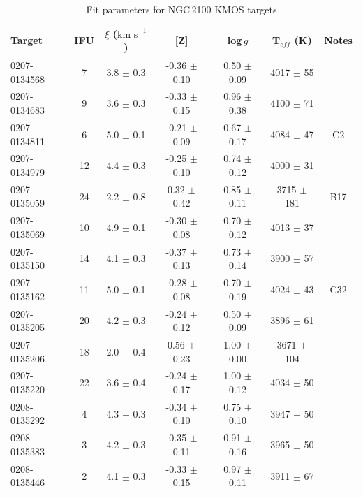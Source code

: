 \documentclass[useAMS,usenatbib]{mn2e}
\def\kms{$\mbox{km s}^{-1}$}
\begin{document}
\begin{table}
\begin{center}
\caption{
Fit parameters for NGC\,2100 KMOS targets
\label{tb:stellar-params}
         }
\scriptsize
\begin{tabular}{lc ccccc}
 \hline
 \hline
  Target  & IFU & $\xi$ (\kms) & [Z] & log\,$g$ & T$_{eff}$ (K) & Notes\\
  \hline
0207-0134568 & 7  & 3.8 $\pm$ 0.3 &  -0.36 $\pm$ 0.10 & 0.50 $\pm$ 0.09 & 4017 $\pm$ 55  & \\
0207-0134683 & 9  & 3.6 $\pm$ 0.3 &  -0.33 $\pm$ 0.15 & 0.96 $\pm$ 0.38 & 4100 $\pm$ 71  & \\
0207-0134811 & 6  & 5.0 $\pm$ 0.1 &  -0.21 $\pm$ 0.09 & 0.67 $\pm$ 0.17 & 4084 $\pm$ 47  & C2\\
0207-0134979 & 12 & 4.4 $\pm$ 0.3 &  -0.25 $\pm$ 0.10 & 0.74 $\pm$ 0.12 & 4000 $\pm$ 31  & \\
0207-0135059 & 24 & 2.2 $\pm$ 0.8 &   0.32 $\pm$ 0.42 & 0.85 $\pm$ 0.11 & 3715 $\pm$ 181 & B17\\
0207-0135069 & 10 & 4.9 $\pm$ 0.1 &  -0.30 $\pm$ 0.08 & 0.70 $\pm$ 0.12 & 4013 $\pm$ 37  & \\
0207-0135150 & 14 & 4.1 $\pm$ 0.3 &  -0.37 $\pm$ 0.13 & 0.73 $\pm$ 0.14 & 3900 $\pm$ 57  & \\
0207-0135162 & 11 & 5.0 $\pm$ 0.1 &  -0.28 $\pm$ 0.08 & 0.70 $\pm$ 0.19 & 4024 $\pm$ 43  & C32\\
0207-0135205 & 20 & 4.2 $\pm$ 0.3 &  -0.24 $\pm$ 0.12 & 0.50 $\pm$ 0.09 & 3896 $\pm$ 61  & \\
0207-0135206 & 18 & 2.0 $\pm$ 0.4 &   0.56 $\pm$ 0.23 & 1.00 $\pm$ 0.00 & 3671 $\pm$ 104 & \\
0207-0135220 & 22 & 3.6 $\pm$ 0.4 &  -0.24 $\pm$ 0.17 & 1.00 $\pm$ 0.12 & 4034 $\pm$ 50  & \\
0208-0135292 & 4  & 4.3 $\pm$ 0.3 &  -0.34 $\pm$ 0.10 & 0.75 $\pm$ 0.10 & 3947 $\pm$ 50  & \\
0208-0135383 & 3  & 4.2 $\pm$ 0.3 &  -0.35 $\pm$ 0.11 & 0.91 $\pm$ 0.16 & 3965 $\pm$ 50  & \\
0208-0135446 & 2  & 4.1 $\pm$ 0.3 &  -0.33 $\pm$ 0.15 & 0.97 $\pm$ 0.11 & 3911 $\pm$ 67  & \\

  \hline
  \end{tabular}
  \end{center}
\end{table}

\end{document}
